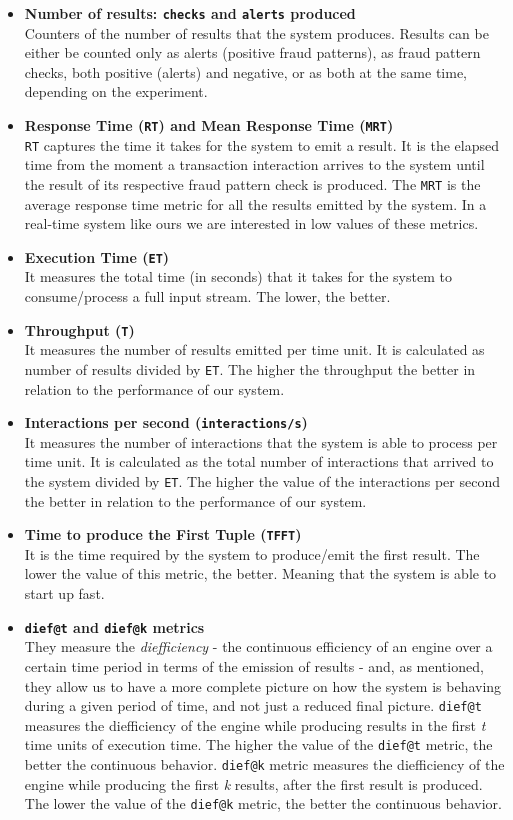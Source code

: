 \begin{itemize}
    \item \textbf{Number of results: \texttt{checks} and \texttt{alerts} produced\\}
    Counters of the number of results that the system produces. Results can be either be counted only as alerts (positive fraud patterns), as fraud pattern checks, both positive (alerts) and negative, or as both at the same time, depending on the experiment. 
    \item \textbf{Response Time (\texttt{RT}) and Mean Response Time (\texttt{MRT})\\}
    \texttt{RT} captures the time it takes for the system to emit a result. It is the elapsed time from the moment a transaction interaction arrives to the system until the result of its respective fraud pattern check is produced. The \texttt{MRT} is the average response time metric for all the results emitted by the system. In a real-time system like ours we are interested in low values of these metrics.
    \item \textbf{Execution Time (\texttt{ET})\\}
    It measures the total time (in seconds) that it takes for the system to consume/process a full input stream. The lower, the better.
    \item \textbf{Throughput (\texttt{T})\\}
    It measures the number of results emitted per time unit. It is calculated as number of results divided by \texttt{ET}. The higher the throughput the better in relation to the performance of our system.
    \item \textbf{Interactions per second (\texttt{interactions/s})\\}
    It measures the number of interactions that the system is able to process per time unit. It is calculated as the total number of interactions that arrived to the system divided by \texttt{ET}. The higher the value of the interactions per second the better in relation to the performance of our system.
    \item \textbf{Time to produce the First Tuple (\texttt{TFFT})\\}
    It is the time required by the system to produce/emit the first result. The lower the value of this metric, the better. Meaning that the system is able to start up fast.
    \item \textbf{\texttt{dief@t} and \texttt{dief@k} metrics\\}
    They measure the \emph{diefficiency} - the continuous efficiency of an engine over a certain time period in terms of the emission of results - and, as mentioned, they allow us to have a more complete picture on how the system is behaving during a given period of time, and not just a reduced final picture. \texttt{dief@t} measures the diefficiency of the engine while producing results in the first \emph{t} time units of execution time. The higher the value of the \texttt{dief@t} metric, the better the continuous behavior. \texttt{dief@k} metric measures the diefficiency of the engine while producing the first \emph{k} results, after the first result is produced. The lower the value of the \texttt{dief@k} metric, the better the continuous behavior.


\end{itemize}
